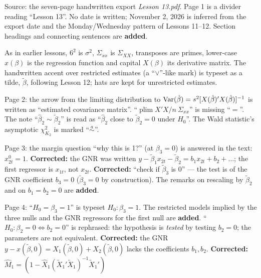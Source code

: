 \documentclass[11pt]{article}
\begin{document}
\clearpage
\begin{transcriptnotes}
 \item Source: the seven-page handwritten export \emph{Lesson 13.pdf}. Page 1 is a
       divider reading ``Lesson 13''. No date is written; November 2, 2026 is
       inferred from the export date and the Monday/Wednesday pattern of Lessons
       11--12. Section headings and connecting sentences are \textbf{added}.
 \item As in earlier lessons, $6^{2}$ is $\sigma^{2}$, $\Sigma_{xx}$ is $\Sigma_{XX}$,
       transposes are primes, lower-case $x(\beta)$ is the regression function and
       capital $X(\beta)$ its derivative matrix. The handwritten accent over restricted
       estimates (a ``$\vee$''-like mark) is typeset as a tilde, $\tilde\beta$, following
       Lesson 12; hats are kept for unrestricted estimates.
 \item Page 2: the arrow from the limiting distribution to
       $\operatorname{Var}(\hat\beta)=s^{2}[X(\hat\beta)'X(\hat\beta)]^{-1}$ is written as
       ``estimated covariance matrix''. ``$\operatorname{plim}X'X/n\ \Sigma_{xx}$'' is
       missing ``$=$''. The note ``$\hat\beta_{2}\sim\tilde\beta_{2}$'' is read as
       ``$\hat\beta_{2}$ close to $\tilde\beta_{2}=0$ under $H_{0}$''. The Wald statistic's
       asymptotic $\chi^{2}_{K_{2}}$ is marked ``$\overset{a}{\sim}$''.
 \item Page 3: the margin question ``why this is 1?'' (at $\beta_{3}=0$) is answered
       in the text: $x_{2t}^{0}=1$. \textbf{Corrected:} the GNR was written
       $y-\tilde\beta_{1}x_{2t}-\tilde\beta_{2}=b_{1}x_{2t}+b_{2}+\ldots$; the first
       regressor is $x_{1t}$, not $x_{2t}$. \textbf{Corrected:} ``check if
       $\tilde\beta_{3}$ is 0'' --- the test is of the GNR coefficient $b_{3}=0$
       ($\tilde\beta_{3}=0$ by construction). The remarks on rescaling by
       $\tilde\beta_{2}$ and on $b_{1}=b_{2}=0$ are \textbf{added}.
 \item Page 4: ``$H_{0}=\beta_{3}=1$'' is typeset $H_{0}:\beta_{3}=1$. The restricted
       models implied by the three nulls and the GNR regressors for the first null are
       \textbf{added}. ``$H_{0}:\beta_{2}=0\Leftrightarrow b_{2}=0$'' is rephrased: the
       hypothesis is \emph{tested} by testing $b_{2}=0$; the parameters are not
       equivalent. \textbf{Corrected:} the GNR $y-x(\tilde\beta,0)=X_{1}(\tilde\beta,0)+
       X_{2}(\tilde\beta,0)$ lacks the coefficients $b_{1},b_{2}$.
       \textbf{Corrected:} $\hat M_{1}=(1-\hat X_{1}(\tilde X_{1}'\tilde X_{1})^{-1}\tilde X_{1}')$

\end{transcriptnotes}
\end{document}
